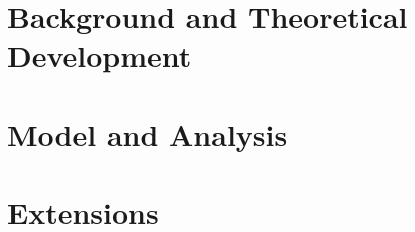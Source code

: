 

\part{Background and Theoretical Development} \label{part-background}





\part{Model and Analysis} \label{part-model}


\part{Extensions} \label{part-extensions}




